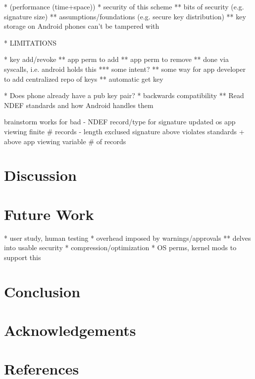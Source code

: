\documentclass[12pt]{article}
\begin{document}
* (performance (time+space))
* security of this scheme
** bits of security (e.g. signature size)
** assumptions/foundations (e.g. secure key distribution)
** key storage on Android phones can't be tampered with

* LIMITATIONS

* key add/revoke
** app perm to add
** app perm to remove
** done via syscalls, i.e. android holds this
*** some intent?
** some way for app developer to add centralized repo of keys
** automatic get key

* Does phone already have a pub key pair?
* backwards compatibility
** Read NDEF standards and how Android handles them

brainstorm                         works for                           bad
- NDEF record/type for signature   updated os
                                   app viewing finite \# records
- length exclused signature        above                               violates standards
  + above                          app viewing variable \# of records   

\section{Discussion}

\section{Future Work}
* user study, human testing
* overhead imposed by warnings/approvals
** delves into usable security
* compression/optimization
* OS perms, kernel mods to support this

\section{Conclusion}

\section{Acknowledgements}

\section{References}
\end{document}
